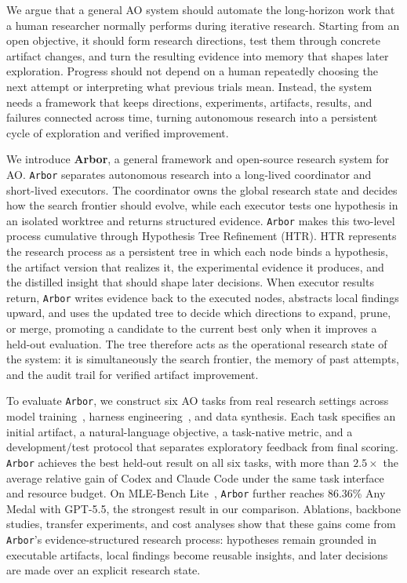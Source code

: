 \documentclass{llmxive}
\providecommand{\arbor}{\texttt{Arbor}}
\begin{document}
We argue that a general AO system should automate the long-horizon work that a human researcher normally performs during iterative research. Starting from an open objective, it should form research directions, test them through concrete artifact changes, and turn the resulting evidence into memory that shapes later exploration. Progress should not depend on a human repeatedly choosing the next attempt or interpreting what previous trials mean. Instead, the system needs a framework that keeps directions, experiments, artifacts, results, and failures connected across time, turning autonomous research into a persistent cycle of exploration and verified improvement.

We introduce \textbf{Arbor}, a general framework and open-source research system for AO. \arbor{} separates autonomous research into a long-lived coordinator and short-lived executors. The coordinator owns the global research state and decides how the search frontier should evolve, while each executor tests one hypothesis in an isolated worktree and returns structured evidence. \arbor{} makes this two-level process cumulative through Hypothesis Tree Refinement (HTR). HTR represents the research process as a persistent tree in which each node binds a hypothesis, the artifact version that realizes it, the experimental evidence it produces, and the distilled insight that should shape later decisions. When executor results return, \arbor{} writes evidence back to the executed nodes, abstracts local findings upward, and uses the updated tree to decide which directions to expand, prune, or merge, promoting a candidate to the current best only when it improves a held-out evaluation. The tree therefore acts as the operational research state of the system: it is simultaneously the search frontier, the memory of past attempts, and the audit trail for verified artifact improvement.

To evaluate \arbor{}, we construct six AO tasks from real research settings across model training~\citep{nanogptbench,autoresearch}, harness engineering~\citep{terminalbench,browsecomp}, and data synthesis. Each task specifies an initial artifact, a natural-language objective, a task-native metric, and a development/test protocol that separates exploratory feedback from final scoring. \arbor{} achieves the best held-out result on all six tasks, with more than $2.5\times$ the average relative gain of Codex and Claude Code under the same task interface and resource budget. On MLE-Bench Lite~\citep{mlebench}, \arbor{} further reaches 86.36\% Any Medal with GPT-5.5, the strongest result in our comparison. Ablations, backbone studies, transfer experiments, and cost analyses show that these gains come from \arbor{}'s evidence-structured research process: hypotheses remain grounded in executable artifacts, local findings become reusable insights, and later decisions are made over an explicit research state.
\end{document}
